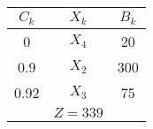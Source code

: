     \begin{tabular}{ccc}
    \hline
    \hline
    $C_k$   & $X_k$   & $B_k$ \bigstrut\\
    \hline
    0       & $X_4$   & 20 \bigstrut[t]\\
    0.9     & $X_2$   & 300 \\
    0.92    & $X_3$   & 75 \bigstrut[b]\\
    \hline
            & $Z=339$ &  \bigstrut\\
    \hline
    \hline
    \end{tabular}%
